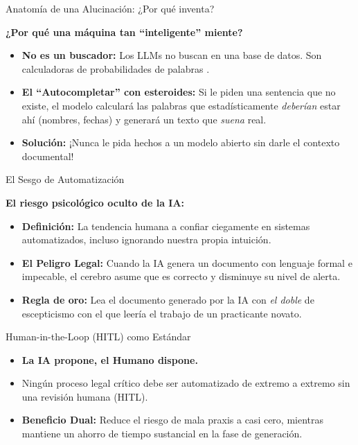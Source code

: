 \documentclass[aspectratio=169]{beamer}
\begin{document}
\begin{frame}{Anatomía de una Alucinación: ¿Por qué inventa?}


\textbf{¿Por qué una máquina tan ``inteligente'' miente?}
\begin{itemize}
  \item \textbf{No es un buscador:} Los LLMs no buscan en una base de datos. Son calculadoras de probabilidades de palabras \cite{openai2023}.
  \item \textbf{El ``Autocompletar'' con esteroides:} Si le piden una sentencia que no existe, el modelo calculará las palabras que estadísticamente \textit{deberían} estar ahí (nombres, fechas) y generará un texto que \textit{suena} real.
  \item \textbf{Solución:} ¡Nunca le pida hechos a un modelo abierto sin darle el contexto documental!
\end{itemize}
\end{frame}

\begin{frame}{El Sesgo de Automatización}


\textbf{El riesgo psicológico oculto de la IA:}
\begin{itemize}
  \item \textbf{Definición:} La tendencia humana a confiar ciegamente en sistemas automatizados, incluso ignorando nuestra propia intuición.
  \item \textbf{El Peligro Legal:} Cuando la IA genera un documento con lenguaje formal e impecable, el cerebro asume que es correcto y disminuye su nivel de alerta.
  \item \textbf{Regla de oro:} Lea el documento generado por la IA con \textit{el doble} de escepticismo con el que leería el trabajo de un practicante novato.
\end{itemize}
\end{frame}

\begin{frame}{Human-in-the-Loop (HITL) como Estándar}


\begin{itemize}
  \item \textbf{La IA propone, el Humano dispone.}
  \item Ningún proceso legal crítico debe ser automatizado de extremo a extremo sin una revisión humana (HITL).
  \item \textbf{Beneficio Dual:} Reduce el riesgo de mala praxis a casi cero, mientras mantiene un ahorro de tiempo sustancial en la fase de generación.
\end{itemize}
\end{frame}
\end{document}
